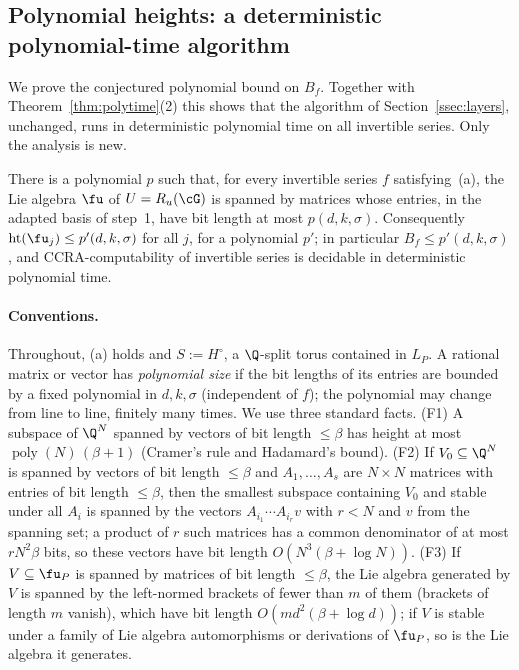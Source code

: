 \subsection{Polynomial heights: a deterministic polynomial-time algorithm}\label{ssec:detpoly}

We prove the conjectured polynomial bound on $B_f$. Together with Theorem~\ref{thm:polytime}(2)
this shows that the algorithm of Section~\ref{ssec:layers}, unchanged, runs in deterministic
polynomial time on all invertible series. Only the analysis is new.

\begin{theorem}\label{thm:detpoly}
There is a polynomial $p$ such that, for every invertible series $f$ satisfying~(a), the Lie algebra
$\fu$ of $U=R_u(\cG)$ is spanned by matrices whose entries, in the adapted basis of step~1, have bit
length at most $p(d,k,\sigma)$. Consequently $\operatorname{ht}(\fu_j)\le p'(d,k,\sigma)$ for all
$j$, for a polynomial $p'$; in particular $B_f\le p'(d,k,\sigma)$, and CCRA-computability of
invertible series is decidable in deterministic polynomial time.
\end{theorem}

\paragraph{Conventions.} Throughout, (a) holds and $S:=H^\circ$, a $\Q$-split torus contained in
$L_P$. A rational matrix or vector has \emph{polynomial size} if the bit lengths of its entries are
bounded by a fixed polynomial in $d,k,\sigma$ (independent of $f$); the polynomial may change from
line to line, finitely many times. We use three standard facts. (F1) A subspace of $\Q^N$ spanned by
vectors of bit length $\le\beta$ has height at most $\operatorname{poly}(N)\,(\beta+1)$ (Cramer's rule
and Hadamard's bound). (F2) If $V_0\subseteq\Q^N$ is spanned by vectors of bit length $\le\beta$ and
$A_1,\ldots,A_s$ are $N\times N$ matrices with entries of bit length $\le\beta$, then the smallest
subspace containing $V_0$ and stable under all $A_i$ is spanned by the vectors $A_{i_1}\cdots
A_{i_r}v$ with $r<N$ and $v$ from the spanning set; a product of $r$ such matrices has a common
denominator of at most $rN^2\beta$ bits, so these vectors have bit length $O(N^3(\beta+\log N))$.
(F3) If $V\subseteq\fu_P$ is spanned by matrices of bit length $\le\beta$, the Lie algebra generated
by $V$ is spanned by the left-normed brackets of fewer than $m$ of them (brackets of length $m$
vanish), which have bit length $O(md^2(\beta+\log d))$; if $V$ is stable under a family of Lie algebra
automorphisms or derivations of $\fu_P$, so is the Lie algebra it generates.


